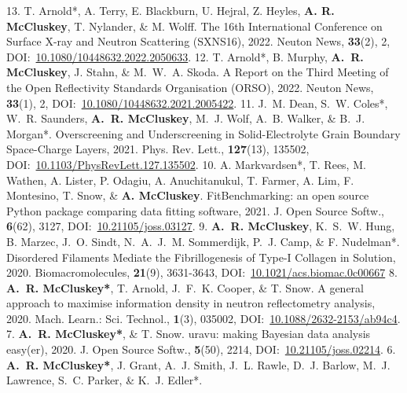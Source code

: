\begin{cvpubys}
    {13.}
  \cvpuby
    {T. Arnold*, A. Terry, E. Blackburn, U. Hejral, Z. Heyles, \textbf{A. R. McCluskey}, T. Nylander, \& M. Wolff.}
    {The 16th International Conference on Surface X-ray and Neutron Scattering (SXNS16),}
    {2022.}
    {Neuton News,}
    {\textbf{33}(2), 2,}
    {DOI:~\href{https://doi.org/10.1080/10448632.2022.2050633}{10.1080/10448632.2022.2050633}.}
    {12.}
  \cvpuby
    {T. Arnold*, B. Murphy, \textbf{A.~R. McCluskey}, J. Stahn, \& M.~W.~A. Skoda.}
    {A Report on the Third Meeting of the Open Reflectivity Standards Organisation (ORSO),}
    {2022.}
    {Neuton News,}
    {\textbf{33}(1), 2,}
    {DOI:~\href{https://doi.org/10.1080/10448632.2021.2005422}{10.1080/10448632.2021.2005422}.}
    {11.}
  \cvpuby
    {J.~M. Dean, S.~W. Coles*, W.~R. Saunders, \textbf{A.~R. McCluskey}, M.~J. Wolf, A.~B. Walker, \& B.~J. Morgan*.}
    {Overscreening and Underscreening in Solid-Electrolyte Grain Boundary Space-Charge Layers,}
    {2021.}
    {Phys. Rev. Lett.,}
    {\textbf{127}(13), 135502,}
    {DOI:~\href{https://doi.org/10.1103/PhysRevLett.127.135502}{10.1103/PhysRevLett.127.135502}.}
    {10.}
  \cvpuby
    {A. Markvardsen*, T. Rees, M. Wathen, A. Lister, P. Odagiu, A. Anuchitanukul, T. Farmer, A. Lim, F. Montesino, T. Snow, \& \textbf{A. McCluskey}.}
    {FitBenchmarking: an open source Python package comparing data fitting software,}
    {2021.}
    {J. Open Source Softw.,}
    {\textbf{6}(62), 3127,}
    {DOI:~\href{https://doi.org/10.21105/joss.03127}{10.21105/joss.03127}.}
    {9.}
  \cvpuby
    {\textbf{A.~R. McCluskey}, K.~S.~W. Hung, B. Marzec, J.~O. Sindt, N.~A.~J.~M. Sommerdijk, P.~J. Camp, \& F. Nudelman*.}
    {Disordered Filaments Mediate the Fibrillogenesis of Type-I Collagen in Solution,}
    {2020.}
    {Biomacromolecules,}
    {\textbf{21}(9), 3631-3643,}
    {DOI:~\href{https://doi.org/10.1021/acs.biomac.0c00667}{10.1021/acs.biomac.0c00667}}
    {8.}
  \cvpuby
    {\textbf{A.~R. McCluskey*}, T. Arnold, J.~F.~K. Cooper, \& T. Snow.}
    {A general approach to maximise information density in neutron reflectometry analysis,}
    {2020.}
    {Mach. Learn.: Sci. Technol.,}
    {\textbf{1}(3), 035002,}
    {DOI:~\href{https://doi.org/10.1088/2632-2153/ab94c4}{10.1088/2632-2153/ab94c4}.}
    {7.}
  \cvpuby
    {\textbf{A.~R. McCluskey*}, \& T. Snow.}
    {uravu: making Bayesian data analysis easy(er),}
    {2020.}
    {J. Open Source Softw.,}
    {\textbf{5}(50), 2214,}
    {DOI:~\href{https://doi.org/10.21105/joss.02214}{10.21105/joss.02214}.}
    {6.}
  \cvpuby
    {\textbf{A.~R. McCluskey*}, J. Grant, A.~J. Smith, J.~L. Rawle, D.~J. Barlow, M.~J. Lawrence, S.~C. Parker, \& K.~J. Edler*.}

\end{cvpubys}
